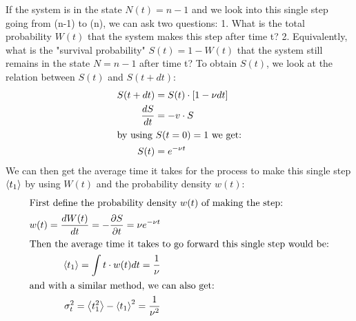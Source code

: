 \documentclass{report}
\begin{document}

If the system is in the state $N(t) = n-1$ and we look into this single step going from (n-1) to (n), we can ask two questions: 1. What is the total probability $W(t)$ that the system makes this step after time t? 2. Equivalently, what is the "survival probability" $S(t)=1-W(t)$ that the system still remains in the state $N=n-1$ after time t? To obtain $S(t)$, we look at the relation between $S(t)$ and $S(t+dt)$:
\begin{align}
    S(t+d t)        & =S(t) \cdot[1-\nu d t] \\
    \frac{d S}{d t} & =-v \cdot S            \\
    \intertext{by using $S(t=0) = 1$ we get:}
    S(t)            & =e^{-\nu t}
\end{align}
We can then get the average time it takes for the process to make this single step $\langle t_1 \rangle$ by using $W(t)$ and the probability density $w(t)$:
\begin{align}
    \intertext{First define the probability density $w(t)$ of making the step:}
    w(t)=\frac{d W(t)}{d t}=-\frac{\partial S}{\partial t}=\nu e^{-\nu t} \\
    \intertext{Then the average time it takes to go forward this single step would be:}
    \left\langle t_1\right\rangle=\int t \cdot w(t) d t=\frac{1}{\nu}     \\
    \intertext{and with a similar method, we can also get:}
    \sigma^2_t = \left\langle t_1^2\right\rangle-\left\langle t_1\right\rangle^2=\frac{1}{\nu^2}
\end{align}
\end{document}
